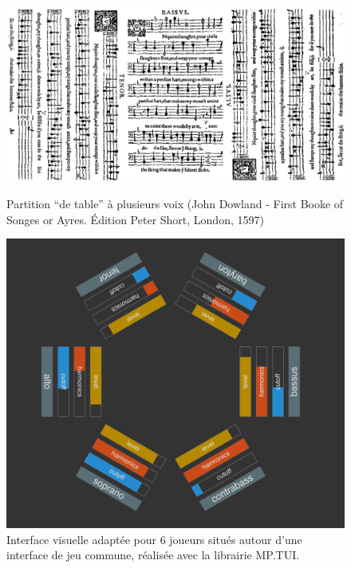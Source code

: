 \begin{figure}[!htbp]
	\captionsetup{format=plain}%
	\centering
	\begin{minipage}[t]{0.58\textwidth}
		\includegraphics[width=\linewidth]{gfx/06_visual_representation/Dowland-firstBookOfSonges.png}
		\caption[Partition ``de table'' à plusieurs voix]{Partition ``de table'' à plusieurs voix (John Dowland - First Booke of Songes or Ayres. Édition Peter Short, London, 1597)}
		\label{fig:visual_representation:table_music}
	\end{minipage}
	\hspace{.02\linewidth}
	\begin{minipage}[t]{0.38\textwidth}
	    \includegraphics[width=\linewidth]{gfx/06_visual_representation/mpTUI_multi-orientation.png}
		\caption[Interface visuelle adaptée pour 6 joueurs]{Interface visuelle adaptée pour 6 joueurs situés autour d'une interface de jeu commune, réalisée avec la librairie MP.TUI.}
		\label{fig:visual_representation:multi_orientation}
	\end{minipage}
\end{figure}

